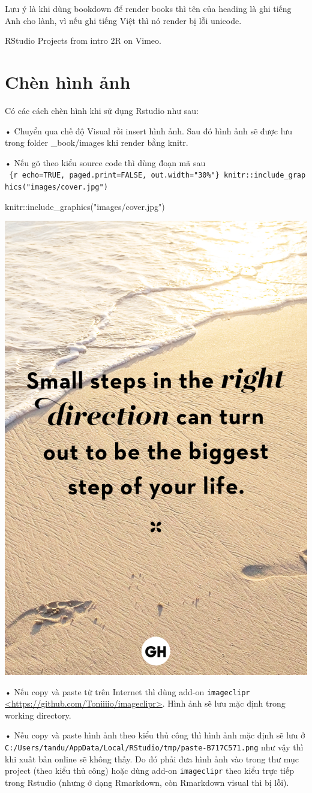 \documentclass[
]{book}
\newenvironment{Shaded}{\begin{snugshade}}{\end{snugshade}}
\newcommand{\FunctionTok}[1]{\textcolor[rgb]{0.00,0.00,0.00}{#1}}
\newcommand{\NormalTok}[1]{#1}
\newcommand{\SpecialCharTok}[1]{\textcolor[rgb]{0.00,0.00,0.00}{#1}}
\newcommand{\StringTok}[1]{\textcolor[rgb]{0.31,0.60,0.02}{#1}}
\begin{document}
Lưu ý là khi dùng bookdown để render books thì tên của heading là ghi tiếng Anh cho lành, vì nếu ghi tiếng Việt thì nó render bị lỗi unicode.

RStudio Projects from intro 2R on Vimeo.

\hypertarget{chuxe8n-huxecnh-ux1ea3nh}{%
\section{Chèn hình ảnh}\label{chuxe8n-huxecnh-ux1ea3nh}}

Có các cách chèn hình khi sử dụng Rstudio như sau:

• Chuyển qua chế độ Visual rồi insert hình ảnh. Sau đó hình ảnh sẽ được lưu trong folder \_book/images khi render bằng knitr.

• Nếu gõ theo kiểu source code thì dùng đoạn mã sau
\texttt{\textasciigrave{}\textasciigrave{}\textasciigrave{}\ \{r\ echo=TRUE,\ paged.print=FALSE,\ out.width="30\%"\}\ knitr::include\_graphics("images/cover.jpg")\ \textasciigrave{}\textasciigrave{}\textasciigrave{}}

\begin{Shaded}
\begin{Highlighting}[]
\NormalTok{knitr}\SpecialCharTok{::}\FunctionTok{include\_graphics}\NormalTok{(}\StringTok{"images/cover.jpg"}\NormalTok{)}
\end{Highlighting}
\end{Shaded}

\includegraphics[width=0.3\linewidth]{images/cover}

• Nếu copy và paste từ trên Internet thì dùng add-on \texttt{imageclipr} \href{https://github.com/Toniiiio/imageclipr}{\textless https://github.com/Toniiiio/imageclipr\textgreater{}}. Hình ảnh sẽ lưu mặc định trong working directory.

• Nếu copy và paste hình ảnh theo kiểu thủ công thì hình ảnh mặc định sẽ lưu ở \texttt{C:/Users/tandu/AppData/Local/RStudio/tmp/paste-B717C571.png} như vậy thì khi xuất bản online sẽ không thấy. Do đó phải đưa hình ảnh vào trong thư mục project (theo kiểu thủ công) hoặc dùng add-on \texttt{imageclipr} theo kiểu trực tiếp trong Rstudio (nhưng ở dạng Rmarkdown, còn Rmarkdown visual thì bị lỗi).
\end{document}
